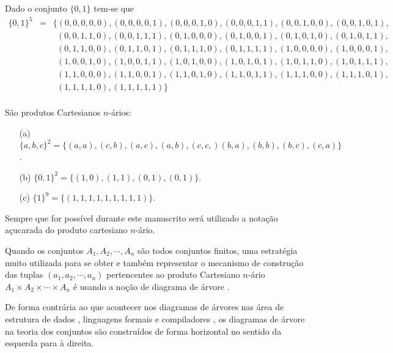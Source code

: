 \begin{example}\label{exe:CartesianoNario2}
	Dado o conjunto $\{0,1\}$ tem-se que 
	\begin{eqnarray*}
		\{0, 1\}^5 & = & \{ (0, 0, 0, 0, 0), (0, 0, 0, 0, 1), (0, 0, 0, 1, 0), (0, 0, 0, 1, 1), (0, 0, 1, 0, 0), (0, 0, 1, 0, 1),\\
		& & \ \ (0, 0, 1, 1, 0), (0, 0, 1, 1, 1), (0, 1, 0, 0, 0), (0, 1, 0, 0, 1), (0, 1, 0, 1, 0), (0, 1, 0, 1, 1),\\
		& & \ \ (0, 1, 1, 0, 0), (0, 1, 1, 0, 1), (0, 1, 1, 1, 0), (0, 1, 1, 1, 1), (1, 0, 0, 0, 0), (1, 0, 0, 0, 1),\\
		& & \ \ (1, 0, 0, 1, 0), (1, 0, 0, 1, 1), (1, 0, 1, 0, 0), (1, 0, 1, 0, 1), (1, 0, 1, 1, 0), (1, 0, 1, 1, 1),\\
		& & \ \ (1, 1, 0, 0, 0), (1, 1, 0, 0, 1), (1, 1, 0, 1, 0), (1, 1, 0, 1, 1), (1, 1, 1, 0, 0), (1, 1, 1, 0, 1),\\
		& & \ \ (1, 1, 1, 1, 0), (1, 1, 1, 1, 1)\}\\
	\end{eqnarray*}
\end{example}

\begin{example}
	São produtos Cartesianos $n$-ários:
	\begin{itemize}
		\item[(a)] $\{a, b, c\}^2 = \{(a, a), (c, b), (a, c), (a, b), (c, c, )(b, a), (b, b), (b, c), (c, a)\}$.
		\item[(b)] $\{0, 1\}^2 = \{(1, 0), (1, 1), (0, 1), (0, 1)\}$.
		\item[(c)] $\{1\}^9 = \{(1, 1, 1, 1, 1, 1, 1, 1, 1)\}$.
	\end{itemize}
\end{example}

\begin{remark}
	Sempre que for possível durante este manuscrito será utilizado a notação açucarada do produto cartesiano $n$-ário.
\end{remark}

Quando os conjuntos $A_1, A_2, \cdots, A_n$ são todos conjuntos finitos, uma estratégia muito utilizada para se obter e também representar o mecanismo de construção das tuplas $(a_1, a_2, \cdots, a_n)$ pertencentes ao produto Cartesiano $n$-ário $A_1 \times A_2 \times \cdots \times A_n$ é usando a noção de diagrama de árvore \cite{lipschutz1978-TC, lipschutz2013-MD}.

\begin{remark}
	De forma contrária ao que acontecer nos diagramas de árvores nas área de estrutura de dados \cite{jaime1994}, linguagens formais \cite{benjaLivro2010, hopcroft2008, linz2006}  e compiladores \cite{aho2007, cooper2017}, os diagramas de árvore na teoria dos conjuntos são construídos de forma horizontal no sentido da esquerda para à direita.
\end{remark}

